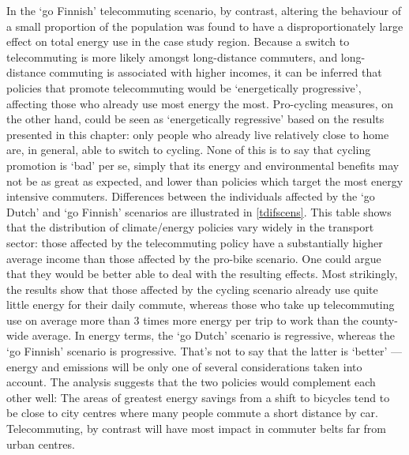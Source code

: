 \documentclass[a4paper, 11pt, twoside]{Thesis}
\begin{document}
In the `go Finnish' telecommuting scenario, by contrast, altering the
behaviour of a small proportion of the population was found to have a
disproportionately large effect on total energy use in the case study region.
Because a switch to telecommuting is more likely amongst long-distance commuters,
and long-distance commuting is associated with higher incomes, it
can be inferred that policies that promote telecommuting would be
`energetically progressive', affecting those who already use most energy the most.
Pro-cycling measures, on the other hand, could be seen as `energetically
regressive' based on the results presented in this chapter: only people
who already live relatively close to home are, in general, able to switch to
cycling. None of this is to say that cycling promotion is `bad' per se,
simply that its energy and environmental benefits may not be as great as
expected, and lower than policies which target the most energy intensive
commuters. Differences between the individuals affected by the `go Dutch'
and `go Finnish' scenarios are illustrated in \cref{tdifscens}. This table
shows that the distribution of climate/energy policies vary widely in
the transport sector: those affected by the telecommuting policy have
a substantially higher average income than those affected by the pro-bike
scenario. One could argue that they would be better able to deal with the
resulting effects. Most strikingly, the results show that those affected
by the cycling scenario already use quite little energy for their daily commute,
whereas those who take up telecommuting use on average more than 3 times more
energy per trip to work than the county-wide average. In energy terms,
the `go Dutch' scenario is regressive, whereas the `go Finnish' scenario is
progressive. That's not to say that the latter is `better' --- energy and
emissions will be only one of several considerations taken into account.
The analysis suggests that the two policies would complement each other well:
The areas of greatest energy savings from a shift to bicycles tend to be close
to city centres where many people commute a short distance by car.
Telecommuting, by contrast will have most impact in commuter belts far from
urban centres.
\end{document}

